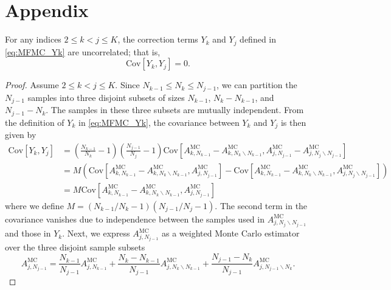 \section{Appendix}\label{sec:Appendix}

\begin{lemma}\label{lemma:Y_k_Y_j}
For any indices $2\le k<j\le K$, the correction terms $Y_k$ and $Y_j$ defined in \eqref{eq:MFMC_Yk} are uncorrelated; that is,
\begin{equation*}
    \text{Cov} \left[Y_k,Y_j\right]=0.
\end{equation*}
\end{lemma}

\begin{proof}
Assume $2\le k<j\le K$. Since $N_{k-1}\le N_k\le N_{j-1}$, we can partition the $N_{j-1}$ samples into three disjoint subsets of sizes $N_{k-1}$, $N_{k}-N_{k-1}$, and $N_{j-1} - N_{k}$. The samples in these three subsets are mutually independent. From the definition of $Y_k$ in \eqref{eq:MFMC_Yk},  the covariance between $Y_k$ and $Y_j$ is then given by
\begin{align*}
    \text{Cov}\left[Y_k,Y_j\right] &= \left(\frac{N_{k-1}}{N_k}-1\right) \left(\frac{N_{j-1}}{N_j}-1\right)\text{Cov}\left[A_{k, N_{k-1}}^{\text{MC}} - A_{k,N_{k}\backslash N_{k-1}}^{\text{MC}}, A_{j,N_{j-1}}^{\text{MC}} - A_{j,N_{j}\backslash N_{j-1}}^{\text{MC}}\right] \\
    & = M \left(\text{Cov}\left[A_{k,N_{k-1}}^{\text{MC}} - A_{k,N_{k}\backslash N_{k-1}}^{\text{MC}}, A_{j,N_{j-1}}^{\text{MC}}\right] - \text{Cov}\left[A_{k,N_{k-1}}^{\text{MC}} - A_{k,N_{k}\backslash N_{k-1}}^{\text{MC}}, A_{j,N_{j}\backslash N_{j-1}}^{\text{MC}}\right] \right)\\
    & = M \text{Cov}\left[A_{k,N_{k-1}}^{\text{MC}} - A_{k,N_{k}\backslash N_{k-1}}^{\text{MC}}, A_{j,N_{j-1}}^{\text{MC}}\right]
\end{align*}
where we define $M = (N_{k-1}/N_k-1) (N_{j-1}/N_j-1)$. The second term in the covariance vanishes due to independence between the samples used in $A_{j,N_{j}\backslash N_{j-1}}^{\text{MC}}$ and those in $Y_k$. Next, we express $A_{j,N_{j-1}}^{\text{MC}}$ as a weighted Monte Carlo estimator over the three disjoint sample subsets
%
\begin{equation*}
    A_{j,N_{j-1}}^{\text{MC}} = \frac{N_{k-1}}{N_{j-1}}A_{j,N_{k-1}}^{\text{MC}} + \frac{N_k - N_{k-1}}{N_{j-1}} A_{j,N_{k}\backslash N_{k-1}}^{\text{MC}} + \frac{N_{j-1} - N_k}{N_{j-1}} A_{j,N_{j-1}\backslash N_{k}}^{\text{MC}}.

\end{equation*}
\end{proof}
